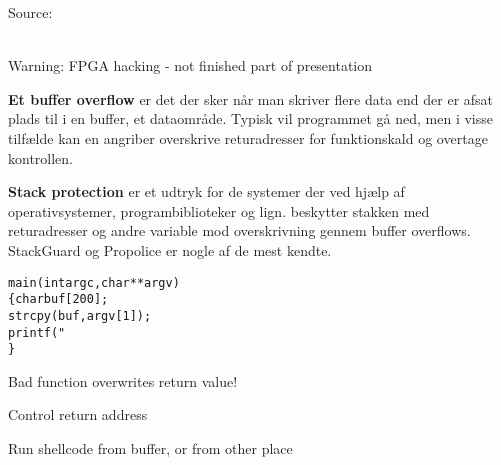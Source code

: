 \documentclass[20pt,landscape,a4paper,footrule]{foils}
\begin{document}
Source:\\
\\




Warning: FPGA hacking - not finished part of presentation \smiley





\begin{list1}
\item {\bfseries Et buffer overflow}
er det der sker når man skriver flere data end der er afsat plads til
i en buffer, et dataområde. Typisk vil programmet gå ned, men i visse
tilfælde kan en angriber overskrive returadresser for funktionskald og
overtage kontrollen. 
\item {\bfseries Stack protection} 
er et udtryk for de systemer der ved hjælp af operativsystemer,
programbiblioteker og lign. beskytter stakken med returadresser og
andre variable mod overskrivning gennem buffer overflows. StackGuard
og Propolice er nogle af de mest kendte.
\end{list1}



\begin{alltt}
main(int argc, char **argv)
\{      char buf[200];
        strcpy(buf, argv[1]); 
        printf("%s\textbackslash{}n",buf);
\}
\end{alltt}





\begin{list1}
\item Bad function overwrites return value!
\item Control return address
\item Run shellcode from buffer, or from other place
\end{list1}


\end{document}
